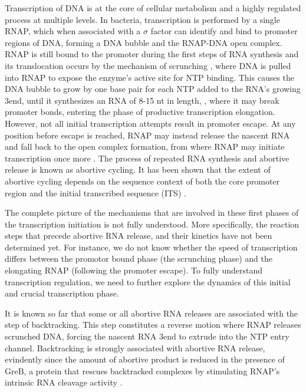%
Transcription of DNA is at the core of cellular metabolism and a highly
regulated process at multiple levels. In bacteria, transcription is performed
by a single RNAP, which when associated with a $\sigma$ factor can identify
and bind to promoter regions of DNA, forming a DNA bubble and the
RNAP-DNA open complex. RNAP is still
bound to the promoter during the first steps of RNA synthesis and its translocation
occurs by the mechanism of scrunching \cite{revyakin_abortive_2006,
kapanidis_initial_2006}, where DNA is pulled into RNAP to expose the enzyme's
active site for NTP binding. This causes the DNA bubble to grow by one base
pair for each NTP added to the RNA's growing 3\ppp end, until it synthesizes an RNA of 8-15 nt in
length,
\cite{carpousis_cycling_1980,hsu_vitro_2003,tang_real-time_2009,hsu_initial_2006},
where it may break promoter bonds,  entering the phase of productive transcription
elongation. However, not all initial transcription attempts result in promoter
escape. At any position before escape is reached, RNAP may instead release the
nascent RNA and fall back to the open complex formation, from where RNAP may
initiate transcription once more \cite{carpousis_cycling_1980}. The process of
repeated RNA synthesis and abortive release is known as abortive cycling. It
has been shown that the extent of abortive cycling depends on the sequence
context of both the core promoter region and the initial transcribed
sequence (ITS) \cite{hsu_initial_2006, hsu_promoter_2002, vo_vitro_2003}.

The complete picture of the mechanisms that are involved in these first phases of the transcription initiation is not fully understood. More specifically,   
the reaction steps that precede abortive RNA release, and their kinetics have not been 
determined yet. For instance, we do not know whether the speed of transcription differs between the promotor bound phase (the scrunching phase) and the elongating RNAP (following the promoter escape). To fully understand transcription regulation, we need to further explore the dynamics of this initial and crucial transcription phase. 

 It is known so far that some or all abortive RNA releases
are associated with the step of backtracking. This step constitutes a reverse motion
where RNAP releases scrunched DNA, forcing the nascent RNA 3\ppp end to
extrude into the NTP entry channel. Backtracking is strongly associated with abortive RNA release, evindently since the amount of abortive product is
reduced in the presence of GreB, a protein that rescues backtracked complexes
by stimulating RNAP's intrinsic RNA cleavage activity
\cite{hsu_initial_2006,hsu_escherichia_1995,feng_grea-induced_1994}.

